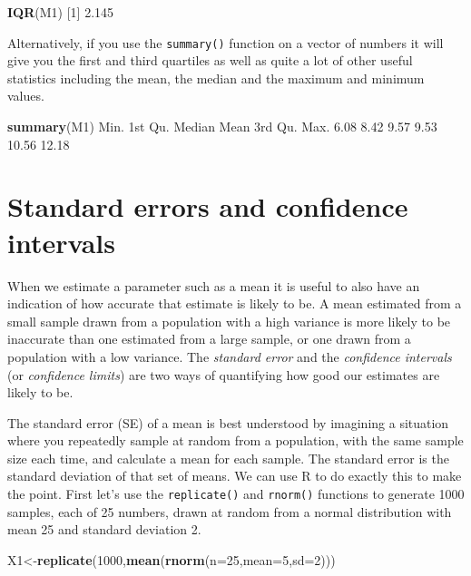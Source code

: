 \documentclass[
]{book}
\newenvironment{Shaded}{\begin{snugshade}}{\end{snugshade}}
\newcommand{\DataTypeTok}[1]{\textcolor[rgb]{0.13,0.29,0.53}{#1}}
\newcommand{\DecValTok}[1]{\textcolor[rgb]{0.00,0.00,0.81}{#1}}
\newcommand{\FloatTok}[1]{\textcolor[rgb]{0.00,0.00,0.81}{#1}}
\newcommand{\KeywordTok}[1]{\textcolor[rgb]{0.13,0.29,0.53}{\textbf{#1}}}
\newcommand{\NormalTok}[1]{#1}
\begin{document}
\begin{Shaded}
\begin{Highlighting}[]
\KeywordTok{IQR}\NormalTok{(M1)}
\NormalTok{[}\DecValTok{1}\NormalTok{] }\FloatTok{2.145}
\end{Highlighting}
\end{Shaded}

Alternatively, if you use the \texttt{summary()} function on a vector of numbers it will give you the first and third quartiles as well as quite a lot of other useful statistics including the mean, the median and the maximum and minimum values.

\begin{Shaded}
\begin{Highlighting}[]
\KeywordTok{summary}\NormalTok{(M1)}
\NormalTok{   Min. 1st Qu.  Median    Mean 3rd Qu.    Max. }
   \FloatTok{6.08}    \FloatTok{8.42}    \FloatTok{9.57}    \FloatTok{9.53}   \FloatTok{10.56}   \FloatTok{12.18} 
\end{Highlighting}
\end{Shaded}

\hypertarget{standard-errors-and-confidence-intervals}{%
\section{Standard errors and confidence intervals}\label{standard-errors-and-confidence-intervals}}

When we estimate a parameter such as a mean it is useful to also have an indication of how accurate that estimate is likely to be. A mean estimated from a small sample drawn from a population with a high variance is more likely to be inaccurate than one estimated from a large sample, or one drawn from a population with a low variance. The \emph{standard error} and the \emph{confidence intervals} (or \emph{confidence limits}) are two ways of quantifying how good our estimates are likely to be.

The standard error (SE) of a mean is best understood by imagining a situation where you repeatedly sample at random from a population, with the same sample size each time, and calculate a mean for each sample. The standard error is the standard deviation of that set of means. We can use R to do exactly this to make the point. First let's use the \texttt{replicate()} and \texttt{rnorm()} functions to generate 1000 samples, each of 25 numbers, drawn at random from a normal distribution with mean 25 and standard deviation 2.

\begin{Shaded}
\begin{Highlighting}[]
\NormalTok{X1<-}\KeywordTok{replicate}\NormalTok{(}\DecValTok{1000}\NormalTok{,}\KeywordTok{mean}\NormalTok{(}\KeywordTok{rnorm}\NormalTok{(}\DataTypeTok{n=}\DecValTok{25}\NormalTok{,}\DataTypeTok{mean=}\DecValTok{5}\NormalTok{,}\DataTypeTok{sd=}\DecValTok{2}\NormalTok{)))}
\end{Highlighting}
\end{Shaded}
\end{document}
